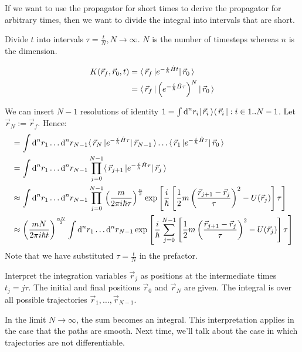 \documentclass[a4paper]{extarticle}
\newcommand{\ihbar}{\frac{i}{\hbar}}
\newcommand{\propagator}{K(\vec{r}_f, \vec{r}_0, t)}
\begin{document}
If we want to use the propagator for short times to derive the propagator for
arbitrary times, then we want to divide the integral into intervals that are
short.

Divide $t$ into intervals $\tau = \frac{t}{N}, N \to \infty$.
$N$ is the number of timesteps whereas $n$ is the dimension.

\begin{align*}
  \propagator
   & = \bra{\vec{r}_f} e^{-\ihbar \hat{H} t} \ket{\vec{r}_0}                     \\
   & = \bra{\vec{r}_f} \left( e^{-\ihbar \hat{H} \tau} \right)^N \ket{\vec{r}_0}
\end{align*}

We can insert $N - 1$ resolutions of identity
$1 = \int \text{d}^n r_{i} \lvert\,\vec{r}_{i}\,\rangle \langle\,\vec{r}_{i}\,\rvert : i \in 1 .. N - 1$.
Let $\vec{r}_N := \vec{r}_f$.
Hence:
\begin{align*}
   & = \int \text{d}^n r_1 \dots \text{d}^n r_{N - 1}
  \bra{\vec{r}_N} e^{-\ihbar \hat{H} \tau} \ket{\vec{r}_{N - 1}} \dots
  \bra{\vec{r}_1} e^{-\ihbar \hat{H} \tau} \ket{\vec{r}_{0}}                      \\
   & = \int \text{d}^n r_1 \dots \text{d}^n r_{N - 1} \prod_{j = 0}^{N - 1}
  \bra{\vec{r}_{j + 1}} e^{-\ihbar \hat{H} \tau} \ket{\vec{r}_{j}}                \\
   & \approx \int \text{d}^n r_1 \dots \text{d}^n r_{N - 1} \prod_{j = 0}^{N - 1}
  \left(\frac{m}{2\pi i\hbar\tau}\right)^{\frac{n}{2}}
  \exp\left[ \ihbar\left[
      \frac{1}{2}m\left( \frac{\vec{r}_{j + 1} - \vec{r}_{j}}{\tau} \right)^2 -
      U(\vec{r}_j)
  \right] \tau \right]                                                            \\
   & \approx
  \left(\frac{m N}{2\pi i\hbar t}\right)^{\frac{n N}{2}}
  \int \text{d}^n r_1 \dots \text{d}^n r_{N - 1}
  \exp\left[
    \ihbar\sum_{j = 0}^{N - 1} \left[
      \frac{1}{2}m\left( \frac{\vec{r}_{j + 1} - \vec{r}_{j}}{\tau} \right)^2 -
      U(\vec{r}_j)
      \right] \tau
    \right]
\end{align*}
Note that we have substituted $\tau = \frac{t}{N}$ in the prefactor.

Interpret the integration variables $\vec{r}_j$ as positions at the intermediate
times $t_j = j \tau$.
The initial and final positions $\vec{r}_0$ and $\vec{r}_N$ are given.
The integral is over all possible trajectories $\vec{r}_1, \dots, \vec{r}_{N - 1}$.

In the limit $N \to \infty$, the sum becomes an integral.
This interpretation applies in the case that the paths are smooth.
Next time, we'll talk about the case in which trajectories are not differentiable.
\end{document}
